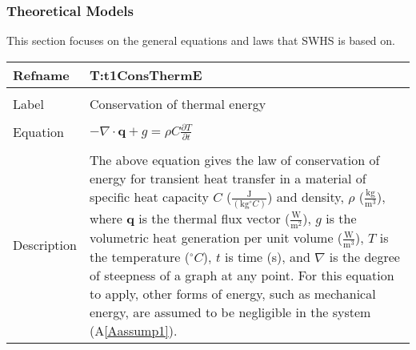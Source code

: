 \documentclass[12pt]{article}
\begin{document}
\subsubsection{Theoretical Models}
\label{Sec:TheoMode}
This section focuses on the general equations and laws that SWHS is based on.
~\newline
\noindent \begin{minipage}{\textwidth}
\begin{tabular}{p{} p{}}
\toprule \textbf{Refname} & \textbf{T:t1ConsThermE}
\label{T:t1ConsThermE}
\\ \midrule \\
Label & Conservation of thermal energy
\\ \midrule \\
Equation & $-\nabla{}\cdot{}\mathbf{q}+g=\rho{}C\frac{\partial{}T}{\partial{}t}$
\\ \midrule \\
Description & The above equation gives the law of conservation of energy for transient heat transfer in a material of specific heat capacity $C$ ($\frac{\text{J}}{(\text{kg}{}^{\circ}C)}$) and density, $\rho{}$ ($\frac{\text{kg}}{\text{m}^{3}}$), where $\mathbf{q}$ is the thermal flux vector ($\frac{\text{W}}{\text{m}^{2}}$), $g$ is the volumetric heat generation per unit volume ($\frac{\text{W}}{\text{m}^{3}}$), $T$ is the temperature (${}^{\circ}C$), $t$ is time (s), and $\nabla{}$ is the degree of steepness of a graph at any point. For this equation to apply, other forms of energy, such as mechanical energy, are assumed to be negligible in the system (A\ref{Aassump1}).
\\ \bottomrule \end{tabular}
\end{minipage}\\
~\newline
\end{document}
